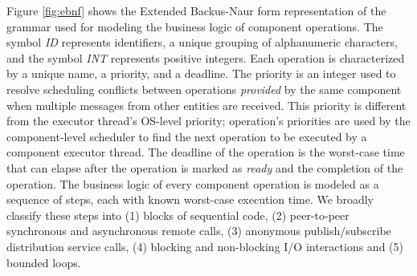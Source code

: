 Figure \ref{fig:ebnf} shows the Extended Backus-Naur form representation of the grammar \cite{SEUS} used for modeling the business logic of component operations. The symbol \emph{ID} represents identifiers, a unique grouping of alphanumeric characters, and the symbol \emph{INT} represents positive integers. Each operation is characterized by a unique name, a priority, and a deadline. The priority is an integer used to resolve scheduling conflicts between operations \emph{provided} by the same component when multiple messages from other entities are received. This priority is different from the executor thread's OS-level priority; operation's priorities are used by the component-level scheduler to find the next operation to be executed by a component executor thread. The deadline of the operation is the worst-case time that can elapse after the operation is marked as \emph{ready} and the completion of the operation. The business logic of every component operation is modeled as a sequence of steps, each with known worst-case execution time. We broadly classify these steps into (1) blocks of sequential code, (2) peer-to-peer synchronous and asynchronous remote calls, (3) anonymous publish/subscribe distribution service calls, (4) blocking and non-blocking I/O interactions and (5) bounded loops.


